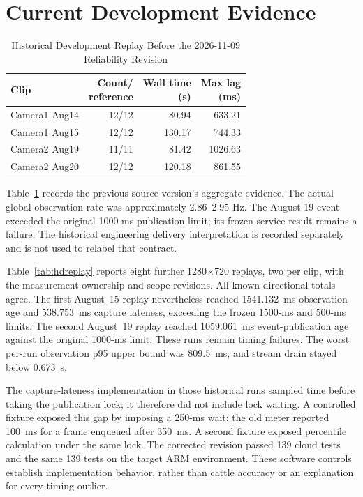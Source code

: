 \documentclass[journal]{IEEEtran}
\begin{document}
\section{Current Development Evidence}


\begin{table}[!t]
\caption{Historical Development Replay Before the 2026-11-09 Reliability Revision}
\label{tab:development}
\centering\small
\begin{tabular}{lrrr}
\toprule
Clip & \shortstack{Count/\\reference} & \shortstack{Wall time\\(s)} & \shortstack{Max lag\\(ms)}\\
\midrule
Camera1 Aug14 & 12/12 & 80.94 & 633.21\\
Camera1 Aug15 & 12/12 & 130.17 & 744.33\\
Camera2 Aug19 & 11/11 & 81.42 & 1026.63\\
Camera2 Aug20 & 12/12 & 120.18 & 861.55\\
\bottomrule
\end{tabular}
\end{table}
Table~\ref{tab:development} records the previous source version's aggregate evidence. The actual global observation rate was approximately 2.86--2.95 Hz. The August 19 event exceeded the original 1000-ms publication limit; its frozen service result remains a failure. The historical engineering delivery interpretation is recorded separately and is not used to relabel that contract.

Table~\ref{tab:hdreplay} reports eight further 1280$\times$720 replays, two per clip, with the measurement-ownership and scope revisions. All known directional totals agree. The first August~15 replay nevertheless reached 1541.132~ms observation age and 538.753~ms capture lateness, exceeding the frozen 1500-ms and 500-ms limits. The second August~19 replay reached 1059.061~ms event-publication age against the original 1000-ms limit. These runs remain timing failures. The worst per-run observation p95 upper bound was 809.5~ms, and stream drain stayed below 0.673~s.

The capture-lateness implementation in those historical runs sampled time before taking the publication lock; it therefore did not include lock waiting. A controlled fixture exposed this gap by imposing a 250-ms wait: the old meter reported 100~ms for a frame enqueued after 350~ms. A second fixture exposed percentile calculation under the same lock. The corrected revision passed 139 cloud tests and the same 139 tests on the target ARM environment. These software controls establish implementation behavior, rather than cattle accuracy or an explanation for every timing outlier.
\end{document}
